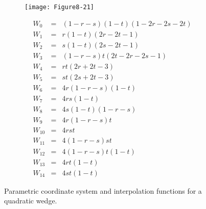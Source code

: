 \begin{figure}[!htb]
	\centering
	\begin{subfigure}{0.48\linewidth}
		\centering
		\texttt{[image: Figure8-21]}
		\caption*{}
	\end{subfigure}
	\hfill
	\begin{subfigure}{0.48\linewidth}
		\centering
		\begin{equation*}
		\begin{array}{lll}
		W_0 &=& (1 - r - s)(1 - t)(1 - 2r -2s -2t) \\
		W_1 &=& r(1 - t)(2r - 2t - 1) \\
		W_2 &=& s(1 - t)(2s - 2t - 1) \\
		W_3 &=& (1 - r - s)t(2t - 2r - 2s - 1) \\
		W_4 &=& rt(2r + 2t - 3) \\
		W_5 &=& st(2s + 2t - 3) \\
		W_6 &=& 4r(1 - r - s)(1 - t) \\
		W_7 &=& 4rs(1 - t) \\
		W_8 &=& 4s(1 - t)(1 - r - s) \\
		W_9 &=& 4r(1 - r - s)t \\
		W_{10} &=& 4 rst \\
		W_{11} &=& 4 (1 - r - s)s t\\
		W_{12} &=& 4 (1 - r - s)t(1 - t) \\
		W_{13} &=& 4rt(1 - t) \\
		W_{14} &=& 4st(1 - t)	
		\end{array}
		\end{equation*}
	\end{subfigure}%
	\caption{Parametric coordinate system and interpolation functions for a quadratic wedge.}
	\label{fig:Figure8-21}
\end{figure}

